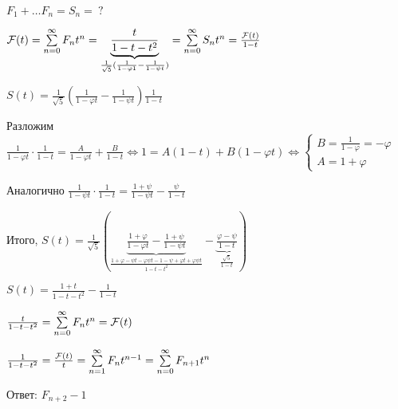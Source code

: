 \documentclass[12pt]{article}
\begin{document}
\begin{Example}{}
    $F_1 + \ldots F_n = S_n =\ ?$

    $\mathcal{F}(t) = \sum\limits_{n = 0}^\infty F_nt^n = \underbrace{\frac{t}{1 - t - t^2}}_{\frac{1}{\sqrt{5}}(\frac{1}{1 - \varphi 1} - \frac{1}{1 - \psi t})} = \sum\limits_{n = 0}^\infty S_nt^n = \frac{\mathcal{F}(t)}{1 - t}$

    $S(t) = \frac{1}{\sqrt{5}}(\frac{1}{1 - \varphi t} - \frac{1}{1 - \psi t}) \frac{1}{1 - t}$

    Разложим $\frac{1}{1 - \varphi t} \cdot \frac{1}{1 - t} = \frac{A}{1 - \varphi t} + \frac{B}{1 - t} \Leftrightarrow 1 = A(1 - t) + B(1 - \varphi t) \Leftrightarrow \begin{cases}
        B = \frac{1}{1 - \varphi} = - \varphi \\
        A = 1 + \varphi
    \end{cases}$

    Аналогично $\frac{1}{1 - \psi t} \cdot \frac{1}{1 - t} = \frac{1 + \psi}{1 - \psi t} - \frac{\psi}{1 - t}$

    Итого, $S(t) = \frac{1}{\sqrt{5}}(\underbrace{\frac{1 + \varphi}{1 - \varphi t} - \frac{1 + \psi}{1 - \psi t}}_{\frac{1 + \varphi - \psi t - \varphi \psi t - 1 - \psi + \varphi t + \varphi \psi t}{1 - t - t^2}} - \underbrace{\frac{\varphi - \psi}{1 - t}}_{\frac{\sqrt{5}}{1 - t}})$

    $S(t) = \frac{1 + t}{1 - t - t^2} - \frac{1}{1 - t}$

    $\frac{t}{1 - t - t^2} = \sum\limits_{n = 0}^\infty F_nt^n = \mathcal{F}(t)$

    $\frac{1}{1 - t - t^2} = \frac{\mathcal{F}(t)}{t} = \sum\limits_{n = 1}^\infty F_nt^{n - 1} = \sum\limits_{ n = 0}^\infty F_{n + 1}t^n$

    Ответ: $F_{n + 2} - 1$
\end{Example}
\end{document}
